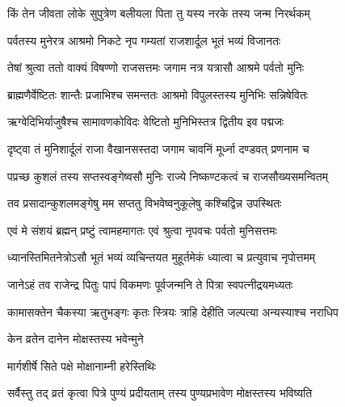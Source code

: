 \twolineshloka
{किं तेन जीवता लोके सुपुत्रेण बलीयला}
{पिता तु यस्य नरके तस्य जन्म निरर्थकम्} %


\twolineshloka
{पर्वतस्य मुनेरत्र आश्रमो निकटे नृप}
{गम्यतां राजशार्दूल भूतं भव्यं विजानतः} %

\twolineshloka
{तेषां श्रुत्वा ततो वाक्यं विषण्णो राजसत्तमः}
{जगाम नत्र यत्रासौ आश्रमे पर्वतो मुनिः} %

\twolineshloka
{ब्राह्मणैर्वेष्टितः शान्तैः प्रजाभिश्च समन्ततः}
{आश्रमो विपुलस्तस्य मुनिभिः सन्निषेवितः} %

\twolineshloka
{ऋग्वेदिभिर्याजुषैश्च सामावणकोविदः}
{वेष्टितो मुनिभिस्तत्र द्वितीय इव पद्मजः} %

\twolineshloka
{दृष्ट्वा तं मुनिशार्दूलं राजा वैखानसस्तदा}
{जगाम चावनिं मूर्ध्ना दण्डवत् प्रणनाम च} %

\twolineshloka
{पप्रच्छ कुशलं तस्य सप्तस्वङ्गेष्वसौ मुनिः}
{राज्ये निष्कण्टकत्वं च राजसौख्यसमन्वितम्} %


\twolineshloka
{तव प्रसादान्कुशलमङ्गेषु मम सप्ततु}
{विभवेष्वनुकूलेषु कश्चिद्विन्न उपस्थितः} %

\twolineshloka
{एवं मे संशयं ब्रह्मन् प्रष्टुं त्वामहमागतः}
{एवं श्रुत्वा नृपवचः पर्वतो मुनिसत्तमः} %

\twolineshloka
{ध्यानस्तिमितनेत्रोऽसौ भूतं भव्यं व्यचिन्तयत}
{मुहूर्तमेकं ध्यात्वा च प्रत्युवाच नृपोत्तमम्} %


\twolineshloka
{जानेऽहं तव राजेन्द्र पितुः पापं विकमणः}
{पूर्वजन्मनि ते पित्रा स्वपत्नीद्रयमध्यतः} %

\twolineshloka
{कामासक्तेन चैकस्या ऋतुभङ्गः कृतः स्त्रियः}
{त्राहि देहीति जल्पत्या अन्यस्याश्च नराधिप} %



\onelineshloka
{केन व्रतेन दानेन मोक्षस्तस्य भवेन्मुने} %



\onelineshloka
{मार्गशीर्षे सिते पक्षे मोक्षानाम्नी हरेस्तिथिः} %

\twolineshloka
{सर्वैस्तु तद् व्रतं कृत्वा पित्रे पुण्यं प्रदीयताम्}
{तस्य पुण्यप्रभावेण मोक्षस्तस्य भविष्यति} %

